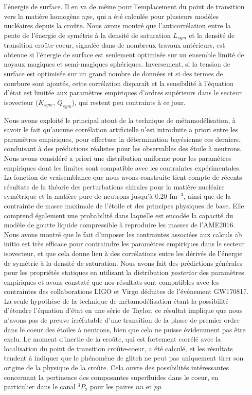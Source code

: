 l'énergie de surface. 
Il en va de même pour l'emplacement du point de transition vers 
la matière homogène $npe$, qui a été calculée pour plusieurs modèles nucléaires
depuis la croûte. 
%
Nous avons montré que l'anticorrélation entre la pente de l'énergie de symétrie
à la densité de saturation $L_{sym}$ et la densité de transition croûte-coeur, 
signalée dans de nombreux travaux antérieurs, est obtenue si l'énergie de 
surface est seulement optimisée sur un ensemble limité de noyaux magiques et 
semi-magiques sphériques. Inversement, si la tension de surface est optimisée 
sur un grand nombre de données et si des termes de courbure sont ajoutés,
cette corrélation disparaît et la sensibilité à l'équation d'état est limitée
aux paramètres empiriques d'ordres supérieurs dans le secteur isovecteur
($K_{sym}$, $Q_{sym}$), qui restent peu contraints à ce jour.

Nous avons exploité le principal atout de la technique de métamodélisation, à 
savoir le fait qu'aucune corrélation artificielle n'est introduite a priori 
entre les paramètres empiriques, pour effectuer la détermination bayésienne ces
derniers, conduisant à des prédictions réalistes pour les observables des 
étoile à neutrons. Nous avons considéré a priori une distribution uniforme pour 
les paramètres empiriques dont les limites sont compatible avec les 
contraintes expérimentales. 
%
La fonction de vraisemblance que nous avons construite tient compte de 
récents résultats de la théorie des perturbations chirales pour la matière 
nucléaire symétrique et la matière pure de neutrons jusqu'à 0.20 fm$^{-3}$,
ainsi que de la contrainte de masse maximale de l'étoile et des principes
physiques de base. 
Elle comprend également une probabilité dans laquelle est encodée la capacité 
du modèle de goutte liquide compressible à reproduire les masses de l'AME2016. 
Nous avons montré que le fait d'imposer les contraintes 
associées aux calculs ab initio est très efficace pour contraindre les 
paramètres empiriques dans le secteur isovecteur, et que cela donne lieu à des 
corrélations entre les dérivés de l'énergie de symétrie à la densité de 
saturation.
Nous avons fait des prédictions générales pour les propriétés statiques en 
utilisant la distribution \textit{posterior} des paramètres empiriques et avons 
constaté que nos résultats sont compatibles avec les contraintes des 
collaborations LIGO et Virgo déduites de l'événement GW170817.
%
La seule hypothèse de la technique de métamodélisation étant la 
possibilité d'étendre l'équation d'état en une série de Taylor, ce résultat 
implique que nous n'avons pas de preuve irréfutable d'une transition de la 
phase de premier ordre dans le coeur des étoiles à neutrons, bien que cela
ne puisse évidemment pas être exclu.
%
Le moment d'inertie de la croûte, qui est fortement corrélé avec la 
localisation du point de transition croûte-coeur, a été calculé, et les
résultats tendent à indiquer que le phénomène de glitch ne peut pas uniquement
tirer son origine de la physique de la croûte. 
Cela ouvre des possibilités intéressantes concernant la pertinence des 
composantes superfluides dans le coeur, en particulier dans le canal $^3P_2$ 
pour les paires $nn$ et $pp$.

